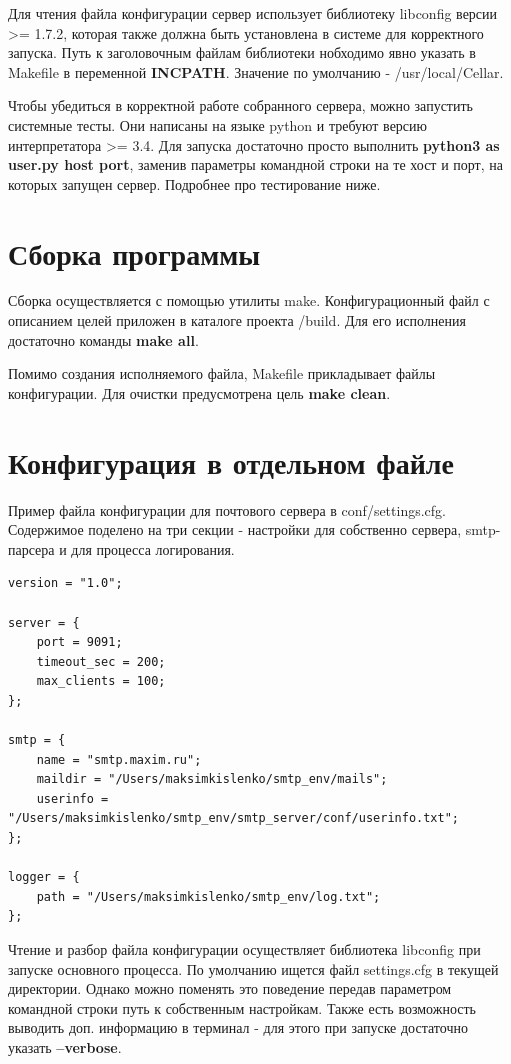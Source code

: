 \documentclass[a4paper,12pt]{report}
\begin{document}
Для чтения файла конфигурации сервер использует библиотеку libconfig версии >= 1.7.2, которая также должна быть установлена в системе для корректного запуска. Путь к заголовочным файлам библиотеки нобходимо явно указать в Makefile в переменной \textbf{INCPATH}. Значение по умолчанию - /usr/local/Cellar.

Чтобы убедиться в корректной работе собранного сервера, можно запустить системные тесты. Они написаны на языке python и требуют версию интерпретатора >= 3.4. Для запуска достаточно просто выполнить \textbf{python3 as user.py host port}, заменив параметры командной строки на те хост и порт, на которых запущен сервер. Подробнее про тестирование ниже.

\section{Сборка программы}

Сборка осуществляется с помощью утилиты make. Конфигурационный файл с описанием целей приложен в каталоге проекта /build. Для его исполнения достаточно команды \textbf{make all}.

Помимо создания исполняемого файла, Makefile прикладывает файлы конфигурации. Для очистки предусмотрена цель \textbf{make clean}.

\section{Конфигурация в отдельном файле}

Пример файла конфигурации для почтового сервера в conf/settings.cfg. Содержимое поделено на три секции - настройки для собственно сервера, smtp-парсера и для процесса логирования.

\begin{verbatim}
version = "1.0";

server = {
    port = 9091;
    timeout_sec = 200;
    max_clients = 100;
};

smtp = {
    name = "smtp.maxim.ru";
    maildir = "/Users/maksimkislenko/smtp_env/mails";
    userinfo = "/Users/maksimkislenko/smtp_env/smtp_server/conf/userinfo.txt";
};

logger = {
    path = "/Users/maksimkislenko/smtp_env/log.txt";
};

\end{verbatim}

Чтение и разбор файла конфигурации осуществляет библиотека libconfig при запуске основного процесса. По умолчанию ищется файл settings.cfg в текущей директории. Однако можно поменять это поведение передав параметром командной строки путь к собственным настройкам. Также есть возможность выводить доп. информацию в терминал - для этого при запуске достаточно указать \textbf{--verbose}.
\end{document}
